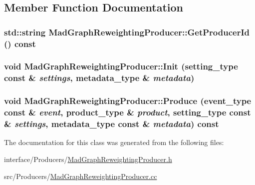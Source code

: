 \subsection{Member Function Documentation}
\hypertarget{classMadGraphReweightingProducer_ac328cc517c9eaf3f374c64a1d7cb3bdf}{
\subsubsection[{GetProducerId}]{\setlength{\rightskip}{0pt plus 5cm}std::string MadGraphReweightingProducer::GetProducerId () const}}
\label{classMadGraphReweightingProducer_ac328cc517c9eaf3f374c64a1d7cb3bdf}
\hypertarget{classMadGraphReweightingProducer_a4b2593bc0cfb1e7379a794fc3f8db1a6}{
\subsubsection[{Init}]{\setlength{\rightskip}{0pt plus 5cm}void MadGraphReweightingProducer::Init (setting\_\-type const \& {\em settings}, \/  metadata\_\-type \& {\em metadata})}}
\label{classMadGraphReweightingProducer_a4b2593bc0cfb1e7379a794fc3f8db1a6}
\hypertarget{classMadGraphReweightingProducer_a96bff51580315adc573dba50c5412f91}{
\subsubsection[{Produce}]{\setlength{\rightskip}{0pt plus 5cm}void MadGraphReweightingProducer::Produce (event\_\-type const \& {\em event}, \/  product\_\-type \& {\em product}, \/  setting\_\-type const \& {\em settings}, \/  metadata\_\-type const \& {\em metadata}) const}}
\label{classMadGraphReweightingProducer_a96bff51580315adc573dba50c5412f91}


The documentation for this class was generated from the following files:\begin{DoxyCompactItemize}
\item 
interface/Producers/\hyperlink{MadGraphReweightingProducer_8h}{MadGraphReweightingProducer.h}\item 
src/Producers/\hyperlink{MadGraphReweightingProducer_8cc}{MadGraphReweightingProducer.cc}\end{DoxyCompactItemize}

